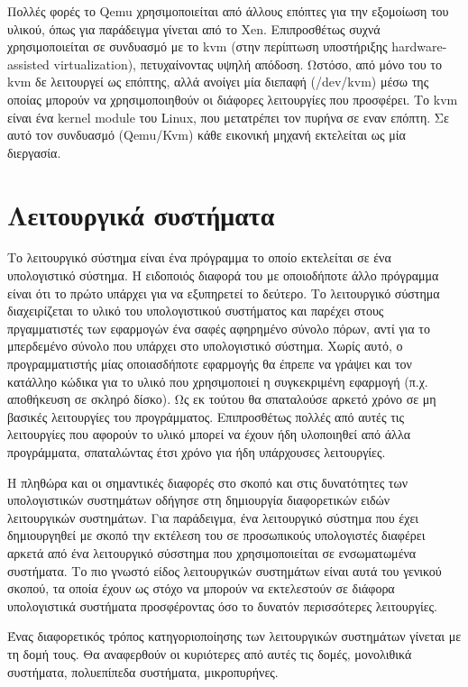 Πολλές φορές το Qemu χρησιμοποιείται από άλλους επόπτες για την εξομοίωση του
υλικού, όπως για παράδειγμα γίνεται από το Xen. Επιπροσθέτως συχνά
χρησιμοποιείται σε συνδυασμό με το kvm (στην περίπτωση υποστήριξης
hardware-assisted virtualization), πετυχαίνοντας υψηλή απόδοση. Ωστόσο, από μόνο
του το kvm δε λειτουργεί ως επόπτης, αλλά ανοίγει μία διεπαφή (/dev/kvm) μέσω
της οποίας μπορούν να χρησιμοποιηθούν οι διάφορες λειτουργίες που προσφέρει.
Το kvm είναι ένα kernel module του Linux, που μετατρέπει τον πυρήνα σε εναν
επόπτη. Σε αυτό τον συνδυασμό (Qemu/Kvm) κάθε εικονική μηχανή εκτελείται ως μία
διεργασία. 

\section{Λειτουργικά συστήματα}

Το λειτουργικό σύστημα είναι ένα πρόγραμμα το οποίο εκτελείται σε ένα
υπολογιστικό σύστημα. Η ειδοποιός διαφορά του με οποιοδήποτε άλλο πρόγραμμα
είναι ότι το πρώτο υπάρχει για να εξυπηρετεί το δεύτερο. Το λειτουργικό σύστημα
διαχειρίζεται το υλικό του υπολογιστικού συστήματος και παρέχει στους
πργαμματιστές των εφαρμογών ένα σαφές αφηρημένο σύνολο πόρων, αντί για το
μπερδεμένο σύνολο που υπάρχει στο υπολογιστικό σύστημα. Χωρίς αυτό, ο
προγραμματιστής μίας οποιασδήποτε εφαρμογής θα έπρεπε να γράψει και τον κατάλληο
κώδικα για το υλικό που χρησιμοποιεί η συγκεκριμένη εφαρμογή (π.χ. αποθήκευση σε
σκληρό δίσκο). Ως εκ τούτου θα σπαταλούσε αρκετό χρόνο σε μη βασικές λειτουργίες
του προγράμματος. Επιπροσθέτως πολλές από αυτές τις λειτουργίες που αφορούν το
υλικό μπορεί να έχουν ήδη υλοποιηθεί από άλλα προγράμματα, σπαταλώντας έτσι
χρόνο για ήδη υπάρχουσες λειτουργίες. 

Η πληθώρα και οι σημαντικές διαφορές στο σκοπό και στις δυνατότητες των
υπολογιστικών συστημάτων οδήγησε στη δημιουργία διαφορετικών ειδών λειτουργικών
συστημάτων. Για παράδειγμα, ένα λειτουργικό σύστημα που έχει δημιουργηθεί με
σκοπό την εκτέλεση του σε προσωπικούς υπολογιστές διαφέρει αρκετά από ένα
λειτουργικό σύσστημα που χρησιμοποιείται σε ενσωματωμένα συστήματα. Το πιο
γνωστό είδος λειτουργικών συστημάτων είναι αυτά του γενικού σκοπού, τα οποία
έχουν ως στόχο να μπορούν να εκτελεστούν σε διάφορα υπολογιστικά συστήματα
προσφέροντας όσο το δυνατόν περισσότερες λειτουργίες. 

Ένας διαφορετικός τρόπος κατηγοριοποίησης των λειτουργικών συστημάτων γίνεται με
τη δομή τους. Θα αναφερθούν οι κυριότερες από αυτές τις δομές, μονολιθικά
συστήματα, πολυεπίπεδα συστήματα, μικροπυρήνες.

